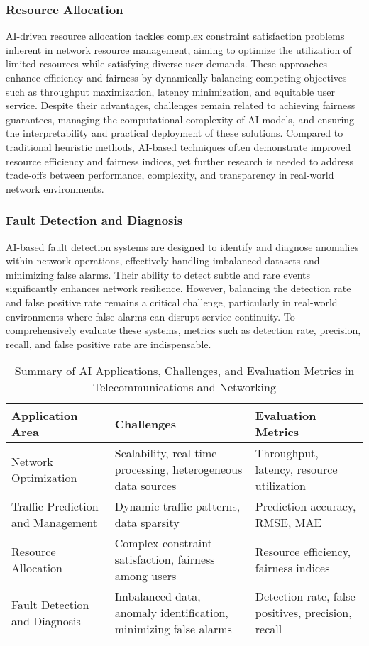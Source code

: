 \documentclass[sigconf]{acmart}
\begin{document}
\subsubsection{Resource Allocation}
AI-driven resource allocation tackles complex constraint satisfaction problems inherent in network resource management, aiming to optimize the utilization of limited resources while satisfying diverse user demands. These approaches enhance efficiency and fairness by dynamically balancing competing objectives such as throughput maximization, latency minimization, and equitable user service. Despite their advantages, challenges remain related to achieving fairness guarantees, managing the computational complexity of AI models, and ensuring the interpretability and practical deployment of these solutions. Compared to traditional heuristic methods, AI-based techniques often demonstrate improved resource efficiency and fairness indices, yet further research is needed to address trade-offs between performance, complexity, and transparency in real-world network environments.

\subsubsection{Fault Detection and Diagnosis}
AI-based fault detection systems are designed to identify and diagnose anomalies within network operations, effectively handling imbalanced datasets and minimizing false alarms. Their ability to detect subtle and rare events significantly enhances network resilience. However, balancing the detection rate and false positive rate remains a critical challenge, particularly in real-world environments where false alarms can disrupt service continuity. To comprehensively evaluate these systems, metrics such as detection rate, precision, recall, and false positive rate are indispensable.

\begin{table*}[htbp]
\centering
\caption{Summary of AI Applications, Challenges, and Evaluation Metrics in Telecommunications and Networking}
\label{tab:ai_telecom_summary}
\begin{adjustbox}{max width=\textwidth}
\begin{tabular}{@{}lll@{}}
\toprule
\textbf{Application Area} & \textbf{Challenges} & \textbf{Evaluation Metrics} \\ \midrule
Network Optimization & Scalability, real-time processing, heterogeneous data sources & Throughput, latency, resource utilization \\
Traffic Prediction and Management & Dynamic traffic patterns, data sparsity & Prediction accuracy, RMSE, MAE \\
Resource Allocation & Complex constraint satisfaction, fairness among users & Resource efficiency, fairness indices \\
Fault Detection and Diagnosis & Imbalanced data, anomaly identification, minimizing false alarms & Detection rate, false positives, precision, recall \\ \bottomrule
\end{tabular}
\end{adjustbox}
\end{table*}
\end{document}
